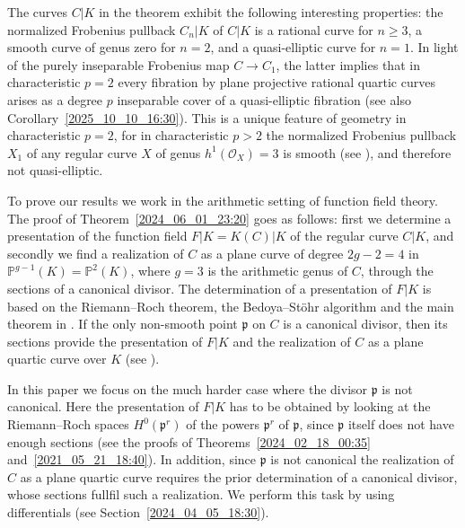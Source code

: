 \documentclass[12pt,reqno]{amsart}
\newcommand{\tode}[2][]{\todo[color=green!50, #1]{#2}} %
\theoremstyle{definition}
\newcommand{\PP}{\mathbb{P}}
\newcommand{\OO}{\mathcal{O}}
\newcommand{\pp}{\mathfrak{p}}
\begin{document}
The curves $C|K$ in the theorem exhibit the following interesting properties: the normalized Frobenius pullback $C_n|K$ of $C|K$ is a rational curve for $n \geq 3$, a smooth curve of genus zero for $n=2$, and a quasi-elliptic curve for $n=1$. 
In light of the purely inseparable Frobenius map $C \to C_1$, the latter implies that in characteristic $p=2$ every fibration by plane projective rational quartic curves arises as a degree $p$ inseparable cover of a quasi-elliptic fibration (see also Corollary~\ref{2025_10_10_16:30}).
This is a unique feature of geometry in characteristic $p=2$, for in characteristic $p > 2$ the normalized Frobenius pullback $X_1$ of any regular curve $X$ of genus $h^1(\OO_X) = 3$ is smooth (see \cite[Corollary~2.7]{HiSt22}), and therefore not quasi-elliptic.

To prove our results we work in the arithmetic setting of function field theory. 
The proof of Theorem~\ref{2024_06_01_23:20} goes as follows:
first we determine a presentation of the function field $F|K = K(C)|K$ of the regular curve $C|K$, and secondly we find a realization of $C$ as a plane curve of degree $2g-2=4$ in $\PP^{g-1}(K) = \PP^2(K)$, 
where $g=3$ is the arithmetic genus of $C$, 
through the sections of a canonical divisor.
The determination of a presentation of $F|K$ is based on the Riemann--Roch theorem, the Bedoya--Stöhr algorithm \cite{BedSt87} and the main theorem in \cite{HiSt22}.
If the only non-smooth point $\pp$ on $C$ is a canonical divisor, then its sections provide the presentation of $F|K$ and the realization of $C$ as a plane quartic curve over $K$ (see \cite{HiSt23}).


In this paper we focus on the much harder case where the divisor $\pp$ is not canonical.
Here the presentation of $F|K$ has to be obtained by looking at the Riemann--Roch spaces $H^0(\pp^r)$ of the powers $\pp^r$ of $\pp$, since $\pp$ itself does not have enough sections (see the proofs of Theorems~\ref{2024_02_18_00:35} and~\ref{2021_05_21_18:40}).
In addition, since $\pp$ is not canonical the realization of $C$ as a plane quartic curve requires the prior determination of a canonical divisor, whose sections fullfil such a realization. We perform this task by using differentials (see Section~\ref{2024_04_05_18:30}).
\end{document}
